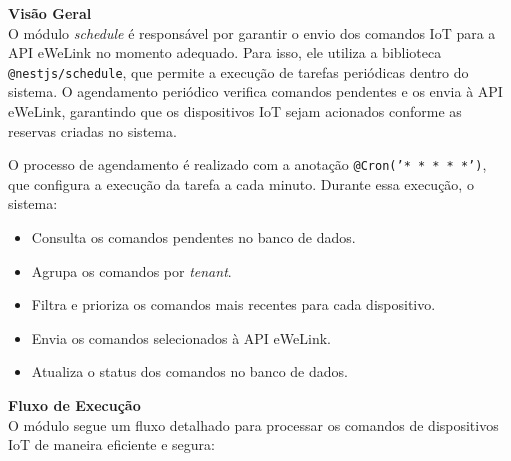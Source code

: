 \textbf{Visão Geral}\\
O módulo \textit{schedule} é responsável por garantir o envio dos comandos IoT para a API eWeLink no momento adequado. Para isso, ele utiliza a biblioteca \texttt{@nestjs/schedule}, que permite a execução de tarefas periódicas dentro do sistema. O agendamento periódico verifica comandos pendentes e os envia à API eWeLink, garantindo que os dispositivos IoT sejam acionados conforme as reservas criadas no sistema.

O processo de agendamento é realizado com a anotação \texttt{@Cron('* * * * *')}, que configura a execução da tarefa a cada minuto. Durante essa execução, o sistema:

\begin{itemize}
    \item Consulta os comandos pendentes no banco de dados.
    \item Agrupa os comandos por \textit{tenant}.
    \item Filtra e prioriza os comandos mais recentes para cada dispositivo.
    \item Envia os comandos selecionados à API eWeLink.
    \item Atualiza o status dos comandos no banco de dados.
\end{itemize}

\textbf{Fluxo de Execução}\\
O módulo segue um fluxo detalhado para processar os comandos de dispositivos IoT de maneira eficiente e segura:

